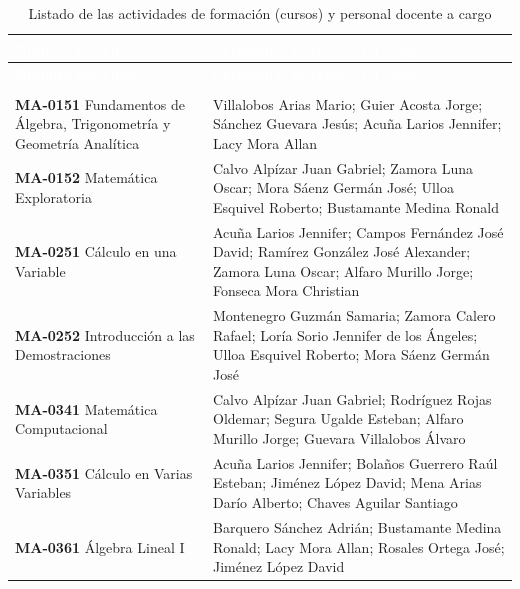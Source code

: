 
\begingroup
\small
{}%
\renewcommand{\arraystretch}{1.2}%
\begin{longtable}{|>{\raggedright\arraybackslash}p{6.9cm}|>{\raggedright\arraybackslash}p{9.8cm}|}
\caption{Listado de las actividades de formación (cursos) y personal docente a cargo}\label{res:docentes}\\
\hline
\rowcolor{Azul-UCR}
\textcolor{white}{\textbf{Nombre del curso}} & \textcolor{white}{\textbf{Persona(s) docente(s) a cargo}} \\ \hline
\endfirsthead
\hline
\rowcolor{Azul-UCR}
\textcolor{white}{\textbf{Nombre del curso}} & \textcolor{white}{\textbf{Persona(s) docente(s) a cargo}} \\ \hline
\endhead
\hline
\endfoot
\rowcolor{Celeste-UCR!35}\multicolumn{2}{|l|}{\textbf{Escuela de Matemática, Departamento de Matemática}} \\ \hline
\textbf{MA-0151} Fundamentos de Álgebra, Trigonometría y Geometría Analítica & Villalobos Arias Mario; Guier Acosta Jorge; Sánchez Guevara Jesús; Acuña Larios Jennifer; Lacy Mora Allan \\ \hline
\textbf{MA-0152} Matemática Exploratoria & Calvo Alpízar Juan Gabriel; Zamora Luna Oscar; Mora Sáenz Germán José; Ulloa Esquivel Roberto; Bustamante Medina Ronald \\ \hline
\textbf{MA-0251} Cálculo en una Variable & Acuña Larios Jennifer; Campos Fernández José David; Ramírez González José Alexander; Zamora Luna Oscar; Alfaro Murillo Jorge; Fonseca Mora Christian \\ \hline
\textbf{MA-0252} Introducción a las Demostraciones & Montenegro Guzmán Samaria; Zamora Calero Rafael; Loría Sorio Jennifer de los Ángeles; Ulloa Esquivel Roberto; Mora Sáenz Germán José \\ \hline
\textbf{MA-0341} Matemática Computacional & Calvo Alpízar Juan Gabriel; Rodríguez Rojas Oldemar; Segura Ugalde Esteban; Alfaro Murillo Jorge; Guevara Villalobos Álvaro \\ \hline
\textbf{MA-0351} Cálculo en Varias Variables & Acuña Larios Jennifer; Bolaños Guerrero Raúl Esteban; Jiménez López David; Mena Arias Darío Alberto; Chaves Aguilar Santiago \\ \hline
\textbf{MA-0361} Álgebra Lineal I & Barquero Sánchez Adrián; Bustamante Medina Ronald; Lacy Mora Allan; Rosales Ortega José; Jiménez López David \\ \hline

\end{longtable}
